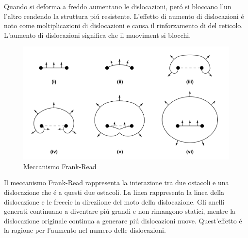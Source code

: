 \documentclass{article}
\begin{document}
                Quando si deforma a freddo aumentano le dislocazioni, per\'o si bloccano l'un l'altro rendendo la struttura pi\'u resistente. L'effetto di aumento di dislocazioni \'e noto come moltiplicazioni di dislocazioni e causa il rinforzamento di del reticolo.\\
                L'aumento di dislocazioni significa che il muoviment si blocchi.
                \begin{figure}[!h]
                    \centering
                    \includegraphics[width=.85\linewidth]{Grafico per Meccanismo Frank-Read.png}
                    \caption{Meccanismo Frank-Read}
                \end{figure}
                Il meccanismo Frank-Read rappresenta la interazione tra due ostacoli e una dislocazione che \'e a questi due ostacoli. La linea rappresenta la linea della dislocazione e le freccie la direziione del moto della dislocazione. Gli anelli generati continuano a diventare pi\'u grandi e non rimangono statici, mentre la dislocazione originale continua a generare pi\'u dislocazioni nuove. Quest'effetto \'e la ragione per l'aumento nel numero delle dislocazioni.
\end{document}
